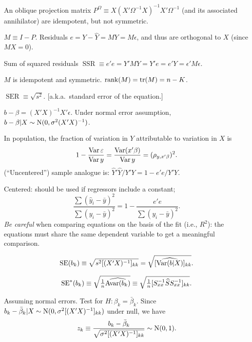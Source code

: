 \documentclass[8pt,letterpaper, landscape]{extarticle} %
\begin{document}
\begin{multicols}{3}
\begin{description}
An oblique projection matrix $ P^{\Omega} \equiv X (X' \Omega^{-1} X)^{-1} X' \Omega^{-1} $ (and its associated annihilator) are idempotent, but not symmetric.

 $ M \equiv I - P $. Residuals $ e = Y - \widehat{Y} = MY = M \epsilon $, and thus are orthogonal to $ X $ (since $ MX = 0 $).

Sum of squared residuals $ \operatorname{SSR} \equiv e' e = Y' M Y = Y' e = e' Y = \epsilon' M \epsilon $.

$ M $ is idempotent and symmetric. $ \operatorname{rank} (M) = \operatorname{tr} (M) = n - K $.

 $ \operatorname{SER} \equiv \sqrt{s^2} $. [a.k.a.\ standard error of the equation.]

 $ b - \beta = (X' X)^{-1} X' \epsilon $. Under normal error assumption, $ b - \beta | X \sim \operatorname{N} (0, \sigma^2 (X' X)^{-1}) $.

 In population, the fraction of variation in $ Y $ attributable to variation in $ X $ is
\[ 1 - \frac{\operatorname{Var} \varepsilon}{\operatorname{Var} y} = \frac{\operatorname{Var} (x' \beta)}{\operatorname{Var} y} = (\rho_{y, x' \beta})^{2}.  \]
(``Uncentered'') sample analogue is: $ \widehat{Y}' \widehat{Y} / Y'Y = 1 - e'e / Y'Y $.

Centered: should be used if regressors include a constant;
$$ \frac{\sum (\hat{y}_i - \bar{y})^2}{\sum (y_i - \bar{y})^2} = 1 - \frac{e'e}{\sum (y_i - \bar{y})^2}. $$
\textit{Be careful} when comparing equations on the basis of the fit (i.e., $ R^2 $): the equations must share the same dependent variable to get a meaningful comparison.

 $$ \operatorname{SE} (b_k) \equiv \sqrt{ s^2 [(X'X)^{-1}]_{kk} } = \sqrt{ [\widehat{\operatorname{Var} (b|X)}]_{kk} } . $$

$$ \operatorname{SE}^* (b_k) \equiv \sqrt{ \tfrac{1}{n} \widehat{\operatorname{Avar} (b_k)} } \equiv \sqrt{ \tfrac{1}{n} [S_{xx}^{-1} \widehat{S} S_{xx}^{-1}]_{kk} } . $$

 Assuming normal errors. Test for $ H \colon \beta_k = \bar{\beta}_k $. Since $ b_k - \bar{\beta}_k | X \sim \operatorname{N} (0, \sigma^2 [(X'X)^{-1}]_{kk} ) $ under null, we have
$$ z_k \equiv \frac{b_k - \bar{\beta}_k}{\sqrt{ \sigma^2 [(X'X)^{-1}]_{kk} }} \sim \operatorname{N} (0,1). $$


\end{description}
\end{multicols}
\end{document}
